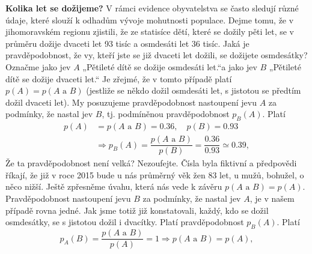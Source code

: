 \begin{mdframed}[style=mdexam]
  \begin{example}\label{mai:exam059}
    \textbf{Kolika let se dožijeme?}\newline
    V rámci evidence obyvatelstva se často sledují různé údaje, které slouží k odhadům vývoje
    mohutnosti populace. Dejme tomu, že v jihomoravském regionu zjistili, že ze statisíce dětí,
    které se dožily pěti let, se v průměru dožije dvaceti let \num{93} tisíc a osmdesáti let
    \num{36} tisíc. Jaká je pravděpodobnost, že vy, kteří jste se již dvaceti let dožili, se
    dožijete osmdesátky? Označme jako jev \(A\) „Pětileté dítě se dožije osmdesáti let.“a jako jev
    \(B\) „Pětileté dítě se dožije dvaceti let.“ Je zřejmé, že v tomto případě platí \(p(A) =
    p(A\text{ a }B)\) (jestliže se někdo dožil osmdesáti let, s jistotou se předtím dožil dvaceti
    let). My posuzujeme pravděpodobnost nastoupení jevu \(A\) za podmínky, že nastal jev \(B\), tj.
    podmíněnou pravděpodobnost \(p_B(A)\). Platí
    \begin{align*}
      p(A)   &= p(A\text{ a }B)  = \num{0.36},\quad p(B) = \num{0.93}                         \\
             &\Rightarrow p_B(A) = \dfrac{p(A\text{ a }B)}{p(B)}                           
                                 = \dfrac{\num{0.36}}{\num{0.93}} \simeq \num{0.39},
    \end{align*}
    Že ta pravděpodobnost není velká? Nezoufejte. Čísla byla fiktivní a předpovědi říkají, že již v
    roce \num{2015} bude u nás průměrný věk žen \num{83} let, u mužů, bohužel, o něco nižší. Ještě
    zpřesněme úvahu, která nás vede k závěru \(p(A\text{ a }B) = p(A)\). Pravděpodobnost nastoupení
    jevu \(B\) za podmínky, že nastal jev \(A\), je v našem případě rovna jedné. Jak jsme totiž již
    konstatovali, každý, kdo se dožil osmdesátky, se s jistotou dožil i dvacítky. Platí
    pravděpodobnost \(p_B(A)\). Platí
    \begin{equation*}
      p_A(B) = \dfrac{p(A\text{ a }B)}{p(A)} = 1 \Rightarrow p(A\text{ a }B) = p(A),
    \end{equation*}
  \end{example}
\end{mdframed}